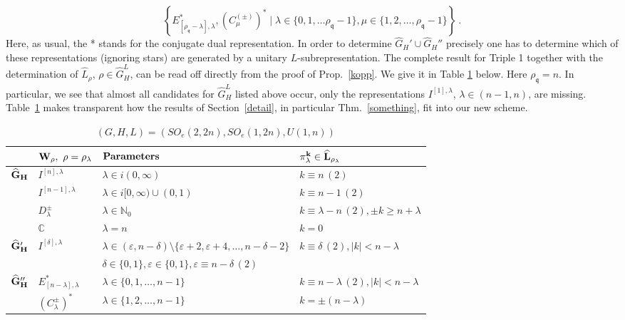 \documentclass[10]{amsart}
\theoremstyle{remark}
\theoremstyle{definition}
\numberwithin{equation}{section}
\newcommand{\C}{\mathbb{C}}           %
\newcommand{\N}{\mathbb{N}}           %
\newcommand{\fq}{{\mathfrak q}}
\newcommand{\ve}{\varepsilon}
\begin{document}
{$$\left\{E_{[\rho_\fq-\lambda],\lambda}^*,(C_\mu^{(\pm)})^*\mid \lambda\in \{0,1,\dots\rho_\fq-1\},\mu\in \{1,2,\dots,\rho_\fq-1\}\right\}\ .$$
Here, as usual, the * stands for the conjugate dual representation. In order to determine $\widehat G_H'\cup\widehat G_H''$ precisely one has to determine which of these representations
(ignoring stars) are generated by a unitary $L$-subrepresentation. The complete result  for Triple 1 together with the determination of $\widehat L_\rho$, $\rho\in\widehat G_H^L$,
can be read off directly from the proof of Prop.~\ref{kopp}. We give it in Table \ref{fax} below. Here $\rho_\fq=n$. In particular, we see that almost all candidates for $\widehat G_H^L$ listed above occur, only the representations $I^{[1],\lambda}$, $\lambda\in (n-1,n)$, are missing. Table~\ref{fax} makes transparent how the results of Section~\ref{detail}, in particular Thm.~\ref{something}, fit into our new scheme.  

\begin{table}[h]
\caption{$(G,H,L)=(SO_e(2,2n),SO_e(1,2n), U(1,n))$}\label{fax}
\begin{center}
\renewcommand{\arraystretch}{1.3}
\begin{tabular}{|l||l||l||l|}
  \hline
  &${\bf W_\rho,\ \rho=\rho_\lambda}$ & ${\bf Parameters}$ & ${\bf \pi^k_\lambda\in\widehat L_{\rho_\lambda}}$\\
  \hline
    \hline
  ${\bf \widehat G_H}$& $I^{[n],\lambda}$ & $\lambda\in i(0,\infty)$ & $k\equiv n\, (2)$\\
    \hline
  &$I^{[n-1],\lambda}$& $\lambda\in i[0,\infty)\cup (0,1)$ & $k\equiv n-1 \, (2)$\\
\hline
&$D_\lambda^\pm$ &$\lambda\in\N_0$&$ k\equiv \lambda-n \, (2), \pm k\ge n+\lambda$ \\
\hline
&$\C$ &$\lambda=n$ & $ k=0$\\
   \hline
    \hline
${\bf \widehat G_H'}$&$I^{[\delta],\lambda}$& $\lambda\in (\ve,n-\delta)\setminus\{\ve+2,\ve+4,\dots,n-\delta-2\}$ & $k\equiv\delta\, (2), |k|<n-\lambda$ \\
&&$\delta\in\{0,1\},\ve\in\{0,1\},\ve\equiv n-\delta\, (2)$&$ $\\
 \hline
    \hline
${\bf \widehat G_H''}$&$E_{[n-\lambda],\lambda}^*$&$\lambda\in\{0,1,\dots,n-1\}$&$k\equiv n-\lambda\, (2), |k|<n-\lambda$ \\
\hline
&$(C^\pm_\lambda)^*$&$\lambda\in\{1,2,\dots,n-1\}$&$k=\pm(n-\lambda)$\\
\hline
\end{tabular}
\end{center}
\end{table}

}
\end{document}
